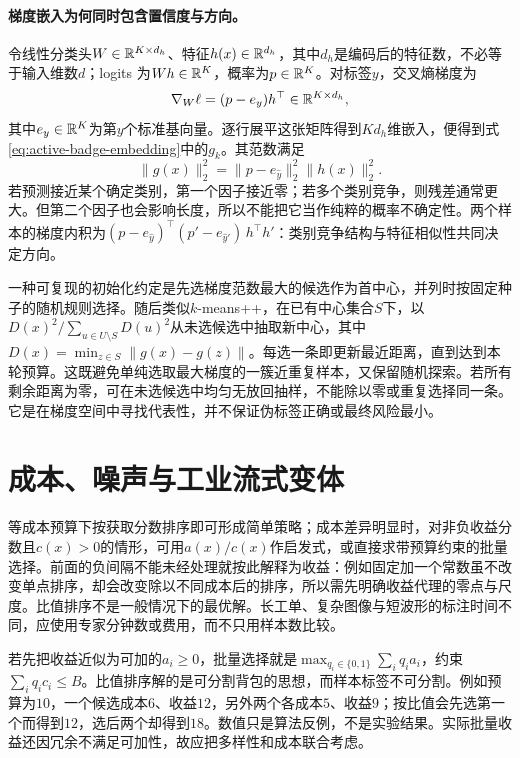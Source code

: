 \paragraph{梯度嵌入为何同时包含置信度与方向。}
令线性分类头$W\in\mathbb{R}^{K\times d_h}$、特征$h(x)\in\mathbb{R}^{d_h}$，其中$d_h$是编码后的特征数，不必等于输入维数$d$；logits 为$Wh\in\mathbb{R}^K$，概率为$p\in\mathbb{R}^K$。对标签$y$，交叉熵梯度为
\begin{equation}
 \nabla_W\ell=(p-e_y)h^\top\in\mathbb{R}^{K\times d_h},
\end{equation}
其中$e_y\in\mathbb{R}^K$为第$y$个标准基向量。逐行展平这张矩阵得到$Kd_h$维嵌入，便得到式\eqref{eq:active-badge-embedding}中的$g_k$。其范数满足
\begin{equation}
 \|g(x)\|_2^2=\|p-e_{\hat y}\|_2^2\|h(x)\|_2^2.
\end{equation}
若预测接近某个确定类别，第一个因子接近零；若多个类别竞争，则残差通常更大。但第二个因子也会影响长度，所以不能把它当作纯粹的概率不确定性。两个样本的梯度内积为$(p-e_{\hat y})^\top(p'-e_{\hat y'})\,h^\top h'$：类别竞争结构与特征相似性共同决定方向。

一种可复现的初始化约定是先选梯度范数最大的候选作为首中心，并列时按固定种子的随机规则选择。随后类似$k$-means++，在已有中心集合$S$下，以$D(x)^2/\sum_{u\in U\setminus S}D(u)^2$从未选候选中抽取新中心，其中$D(x)=\min_{z\in S}\|g(x)-g(z)\|$。每选一条即更新最近距离，直到达到本轮预算。这既避免单纯选取最大梯度的一簇近重复样本，又保留随机探索。若所有剩余距离为零，可在未选候选中均匀无放回抽样，不能除以零或重复选择同一条。它是在梯度空间中寻找代表性，并不保证伪标签正确或最终风险最小。

\section{成本、噪声与工业流式变体}
等成本预算下按获取分数排序即可形成简单策略；成本差异明显时，对非负收益分数且$c(x)>0$的情形，可用$a(x)/c(x)$作启发式，或直接求带预算约束的批量选择。前面的负间隔不能未经处理就按此解释为收益：例如固定加一个常数虽不改变单点排序，却会改变除以不同成本后的排序，所以需先明确收益代理的零点与尺度。比值排序不是一般情况下的最优解。长工单、复杂图像与短波形的标注时间不同，应使用专家分钟数或费用，而不只用样本数比较。

若先把收益近似为可加的$a_i\geq0$，批量选择就是$\max_{q_i\in\{0,1\}}\sum_iq_ia_i$，约束$\sum_iq_ic_i\leq B$。比值排序解的是可分割背包的思想，而样本标签不可分割。例如预算为$10$，一个候选成本$6$、收益$12$，另外两个各成本$5$、收益$9$；按比值会先选第一个而得到$12$，选后两个却得到$18$。数值只是算法反例，不是实验结果。实际批量收益还因冗余不满足可加性，故应把多样性和成本联合考虑。

